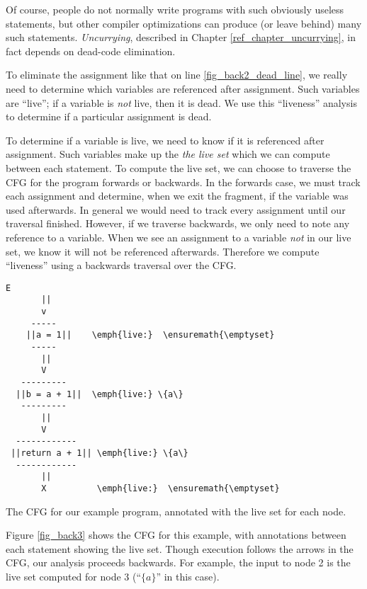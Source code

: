 \documentclass[12pt]{report}
\begin{document}
Of course, people do not normally write programs with such obviously
useless statements, but other compiler optimizations can produce (or
leave behind) many such statements. \emph{Uncurrying}, described in
Chapter \ref{ref_chapter_uncurrying}, in fact depends on dead-code elimination.

To eliminate the assignment like that on line
\ref{fig_back2_dead_line}, we really need to determine which variables
are referenced after assignment. Such variables are ``live''; if a
variable is \emph{not} live, then it is dead. We use this ``liveness''
analysis to determine if a particular assignment is dead.

To determine if a variable is live, we need to know if it is
referenced after assignment.  Such variables make up the \emph{the
  live set} which we can compute between each statement. To compute
the live set, we can choose to traverse the CFG for the program forwards or
backwards.  In the forwards case, we must track each assignment and
determine, when we exit the fragment, if the variable was used
afterwards. In general we would need to track every assignment until
our traversal finished. However, if we traverse backwards, we only
need to note any reference to a variable. When we see an assignment to
a variable \emph{not} in our live set, we know it will not be
referenced afterwards. Therefore we compute ``liveness'' using a
backwards traversal over the CFG.

\begin{myfig}[th]
\begin{minipage}{2in}
\begin{Verbatim}[commandchars=\\\{\}]
       E
       ||      
       v
     -----
    ||a = 1||    \emph{live:}  \ensuremath{\emptyset}
     -----
       ||      
       V
   ---------
  ||b = a + 1||  \emph{live:} \{a\}  
   ---------
       ||      
       V
  ------------
 ||return a + 1|| \emph{live:} \{a\}
  ------------
       ||      
       X          \emph{live:}  \ensuremath{\emptyset}
\end{Verbatim}
\end{minipage}
\caption{The CFG for our example program, annotated with the live
set for each node.}
\label{fig_back3}
\end{myfig}

Figure \ref{fig_back3} shows the CFG for this example, with annotations
between each statement showing the live set. Though
execution follows the arrows in the CFG, our analysis proceeds
backwards. For example, the input to node 2 is the live set computed
for node 3 (``$\{a\}$'' in this case).
\end{document}

